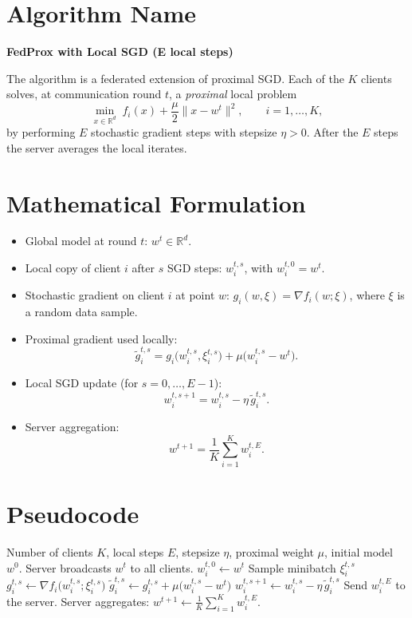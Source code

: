 \documentclass{article}
\begin{document}
\section*{Algorithm Name}
\textbf{FedProx with Local SGD (E local steps)}  

The algorithm is a federated extension of proximal SGD.  
Each of the $K$ clients solves, at communication round $t$, a \emph{proximal} local problem
\[
\min_{x\in\mathbb{R}^d}\; f_i(x) + \frac{\mu}{2}\|x-w^{t}\|^{2},
\qquad i=1,\dots,K,
\]
by performing $E$ stochastic gradient steps with stepsize $\eta>0$.  
After the $E$ steps the server averages the local iterates.

\section*{Mathematical Formulation}
\begin{itemize}
    \item Global model at round $t$: $w^{t}\in\mathbb{R}^{d}$.
    \item Local copy of client $i$ after $s$ SGD steps: $w_{i}^{t,s}$, with $w_{i}^{t,0}=w^{t}$.
    \item Stochastic gradient on client $i$ at point $w$: $g_{i}(w,\xi)=\nabla f_i(w;\xi)$,
          where $\xi$ is a random data sample.
    \item Proximal gradient used locally:
    \[
        \tilde g_{i}^{t,s}=g_{i}\bigl(w_{i}^{t,s},\xi_{i}^{t,s}\bigr)+\mu\bigl(w_{i}^{t,s}-w^{t}\bigr).
    \]
    \item Local SGD update (for $s=0,\dots,E-1$):
    \[
        w_{i}^{t,s+1}=w_{i}^{t,s}-\eta\,\tilde g_{i}^{t,s}.
    \tag{1}
    \]
    \item Server aggregation:
    \[
        w^{t+1}= \frac{1}{K}\sum_{i=1}^{K} w_{i}^{t,E}.
    \tag{2}
    \]
\end{itemize}

\section*{Pseudocode}
\begin{algorithm}[H]
\caption{FedProx with Local SGD}
\begin{algorithmic}[1]
\Require Number of clients $K$, local steps $E$, stepsize $\eta$, proximal weight $\mu$, 
initial model $w^{0}$.
    \State Server broadcasts $w^{t}$ to all clients.
        \State $w_{i}^{t,0}\gets w^{t}$
            \State Sample minibatch $\xi_{i}^{t,s}$
            \State $g_{i}^{t,s}\gets \nabla f_i\!\bigl(w_{i}^{t,s};\xi_{i}^{t,s}\bigr)$
            \State $\tilde g_{i}^{t,s}\gets g_{i}^{t,s}+\mu\bigl(w_{i}^{t,s}-w^{t}\bigr)$
            \State $w_{i}^{t,s+1}\gets w_{i}^{t,s}-\eta\,\tilde g_{i}^{t,s}$   
        \EndFor
        \State Send $w_{i}^{t,E}$ to the server.
    \EndFor
    \State Server aggregates: $w^{t+1}\gets \frac{1}{K}\sum_{i=1}^{K} w_{i}^{t,E}$.
\EndFor
\end{algorithmic}
\end{algorithm}
\end{document}
